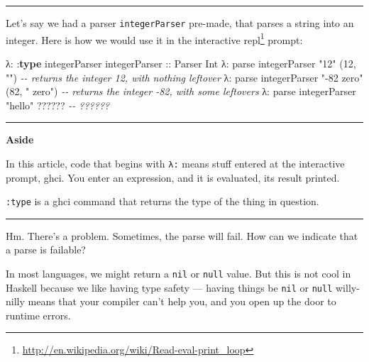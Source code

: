 \documentclass[]{article}
\newenvironment{Shaded}{}{}
\newcommand{\CommentTok}[1]{\textcolor[rgb]{0.38,0.63,0.69}{\textit{#1}}}
\newcommand{\DataTypeTok}[1]{\textcolor[rgb]{0.56,0.13,0.00}{#1}}
\newcommand{\DecValTok}[1]{\textcolor[rgb]{0.25,0.63,0.44}{#1}}
\newcommand{\KeywordTok}[1]{\textcolor[rgb]{0.00,0.44,0.13}{\textbf{#1}}}
\newcommand{\NormalTok}[1]{#1}
\newcommand{\OperatorTok}[1]{\textcolor[rgb]{0.40,0.40,0.40}{#1}}
\newcommand{\OtherTok}[1]{\textcolor[rgb]{0.00,0.44,0.13}{#1}}
\newcommand{\StringTok}[1]{\textcolor[rgb]{0.25,0.44,0.63}{#1}}
\renewcommand{\href}[2]{#2\footnote{\url{#1}}}
\begin{document}
\begin{center}\rule{0.5\linewidth}{0.5pt}\end{center}

Let's say we had a parser \texttt{integerParser} pre-made, that parses a string
into an integer. Here is how we would use it in the interactive
\href{http://en.wikipedia.org/wiki/Read-eval-print_loop}{repl} prompt:

\begin{Shaded}
\begin{Highlighting}[]
\NormalTok{λ}\OperatorTok{:} \OperatorTok{:}\KeywordTok{type}\NormalTok{ integerParser}
\OtherTok{integerParser ::} \DataTypeTok{Parser} \DataTypeTok{Int}
\NormalTok{λ}\OperatorTok{:}\NormalTok{ parse integerParser }\StringTok{"12"}
\NormalTok{(}\DecValTok{12}\NormalTok{, }\StringTok{""}\NormalTok{)                    }\CommentTok{{-}{-} returns the integer 12, with nothing leftover}
\NormalTok{λ}\OperatorTok{:}\NormalTok{ parse integerParser }\StringTok{"{-}82 zero"}
\NormalTok{(}\DecValTok{82}\NormalTok{, }\StringTok{" zero"}\NormalTok{)               }\CommentTok{{-}{-} returns the integer {-}82, with some leftovers}
\NormalTok{λ}\OperatorTok{:}\NormalTok{ parse integerParser }\StringTok{"hello"}
\OperatorTok{??????}                      \CommentTok{{-}{-} ??????}
\end{Highlighting}
\end{Shaded}

\begin{center}\rule{0.5\linewidth}{0.5pt}\end{center}

\textbf{Aside}

In this article, code that begins with \texttt{λ:} means stuff entered at the
interactive prompt, ghci. You enter an expression, and it is evaluated, its
result printed.

\texttt{:type} is a ghci command that returns the type of the thing in question.

\begin{center}\rule{0.5\linewidth}{0.5pt}\end{center}

Hm. There's a problem. Sometimes, the parse will fail. How can we indicate that
a parse is failable?

In most languages, we might return a \texttt{nil} or \texttt{null} value. But
this is not cool in Haskell because we like having type safety --- having things
be \texttt{nil} or \texttt{null} willy-nilly means that your compiler can't help
you, and you open up the door to runtime errors.
\end{document}
